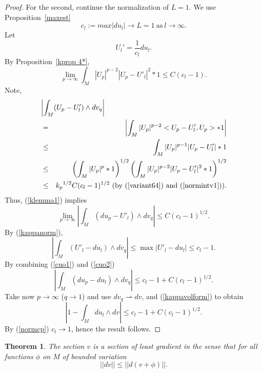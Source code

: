 \documentclass{ip-journal}
\newtheorem{theorem}{Theorem}[section]
\theoremstyle{definition}
\numberwithin{equation}{section}
\begin{document}
\begin{proof}
For the second, 
continue the normalization of $L = 1$.  We use Proposition~\ref{maxest}
\begin{equation}\label{normcp}
c_l := max|du_l| \rightarrow L=1 \ \mbox{as} \  l \rightarrow \infty.
\end{equation}
Let 
\[
{U_l}'=  \frac{1}{c_l}du_l. 
\]
By Proposition~\ref{kprop 4*},
\begin{equation}\label{variant64}
 \lim_ {p \rightarrow \infty} \int_M |U_p|^{p-2} |U_p - U'_l|^2 *1 \leq C(c_l-1).
\end{equation}
Note,
\begin{eqnarray}\label{cuo13}
\lefteqn{\left |\int_M (U_p - U'_l)  \wedge dv_q  \right |} \nonumber \\
&= & \left |\int_M |U_p|^{p-2} <U_p - U'_l, U_p> *1  \right | \nonumber \\
&\leq & \int_M |U_p|^{p-1}|U_p-U'_l| *1   \\
 &\leq &\left( \int_M |U_p|^p *1 \right)^{1/2}\left( \int_M |U_p|^{p-2} |U_p - U'_l|^2 *1 \right)^{1/2}   \nonumber\\
 &\leq & {k_p} ^{1/2}C (c_l-1)^{1/2}  \ (\mbox{by (\ref{variant64}) and (\ref{normintv1})}). \nonumber
\end{eqnarray}
Thus, (\ref{klemma1}) implies
\begin{equation}\label{cuo1}
 \lim_ {p \rightarrow \infty}  \left|\int_M (du_p - U'_l)  \wedge dv_q  \right | \leq C (c_l-1)^{1/2}.
\end{equation}
 By (\ref{kappanorm}),
\begin{equation}\label{cuo2}
\left| \int_M (U'_l - du_l )  \wedge dv_q \right | \leq \max |U'_l - du_l| \leq c_l-1.
\end{equation}
By combining (\ref{cuo1}) and (\ref{cuo2})
\begin{equation}\label{cuo3}
\left| \int_M (du_p - du_l )  \wedge dv_q \right |  \leq  c_l-1+C (c_l-1)^{1/2}.
\end{equation}
Take now $p \rightarrow \infty$ ($q \rightarrow 1$) and use $dv_q  \rightharpoonup dv$,
 and (\ref{kappavolform}) to obtain
 \begin{equation}\label{cuo4}
\left| 1 -\int_M du_l   \wedge dv \right |  \leq c_l-1+C (c_l-1)^{1/2}.
\end{equation}
By (\ref{normcp}) $c_l \rightarrow 1$, hence  
the result follows.
\end{proof}



\begin{theorem}\label{thmlegr} The section $v$ is a section of least gradient in the sense that for  all functions $\phi$ on $M$ of bounded variation
\[
||dv|| \leq ||d (v+\phi)||. 
\]
\end{theorem}
\end{document}
